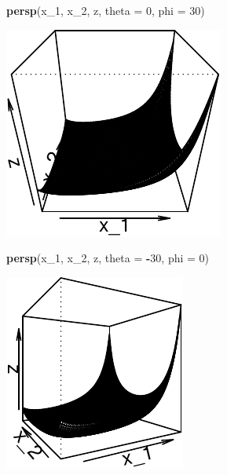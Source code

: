 \documentclass[11pt,]{article}
\newenvironment{Shaded}{\begin{snugshade}}{\end{snugshade}}
\newcommand{\KeywordTok}[1]{\textcolor[rgb]{0.13,0.29,0.53}{\textbf{#1}}}
\newcommand{\DataTypeTok}[1]{\textcolor[rgb]{0.13,0.29,0.53}{#1}}
\newcommand{\DecValTok}[1]{\textcolor[rgb]{0.00,0.00,0.81}{#1}}
\newcommand{\OperatorTok}[1]{\textcolor[rgb]{0.81,0.36,0.00}{\textbf{#1}}}
\newcommand{\NormalTok}[1]{#1}
\begin{document}
\begin{Shaded}
\begin{Highlighting}[]
\KeywordTok{persp}\NormalTok{(x_}\DecValTok{1}\NormalTok{, x_}\DecValTok{2}\NormalTok{, z, }\DataTypeTok{theta =} \DecValTok{0}\NormalTok{, }\DataTypeTok{phi =} \DecValTok{30}\NormalTok{)}
\end{Highlighting}
\end{Shaded}

\begin{center}\includegraphics{Optimization_files/figure-latex/opt_unconstr_optim_2-2} \end{center}

\begin{Shaded}
\begin{Highlighting}[]
\KeywordTok{persp}\NormalTok{(x_}\DecValTok{1}\NormalTok{, x_}\DecValTok{2}\NormalTok{, z, }\DataTypeTok{theta =} \OperatorTok{-}\DecValTok{30}\NormalTok{, }\DataTypeTok{phi =} \DecValTok{0}\NormalTok{)}
\end{Highlighting}
\end{Shaded}

\begin{center}\includegraphics{Optimization_files/figure-latex/opt_unconstr_optim_2-3} \end{center}
\end{document}
